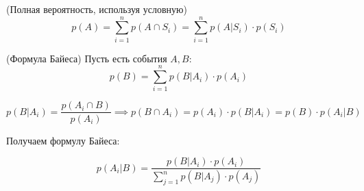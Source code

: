 \begin{definition} (Полная вероятность, используя условную)
    $$p(A) = \sum_{i=1}^{n} p(A \cap S_i) = \sum_{i=1}^{n} p(A | S_i) \cdot p(S_i)$$
\end{definition}

\begin{definition} (Формула Байеса)
    Пусть есть события $A, B$: 
    $$p(B) = \sum_{i=1}^{n} p(B | A_i) \cdot p(A_i)$$
    
    $$p(B | A_i) = \frac{p(A_i \cap B)}{p(A_i)} \implies p(B \cap A_i) = p(A_i) \cdot p(B | A_i) = p(B) \cdot p(A_i | B) $$
    
    Получаем формулу Байеса:
    
    $$p(A_i | B) = \frac{p(B | A_i) \cdot p(A_i)}{\sum_{j=1}^{n} p(B | A_j) \cdot p(A_j)}$$

\end{definition}